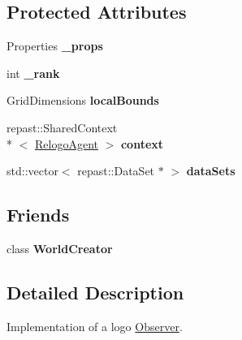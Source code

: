 \subsection*{Protected Attributes}
\begin{DoxyCompactItemize}
\item 
\hypertarget{classrepast_1_1relogo_1_1_observer_a77aae0a56dedd99a7ae481c74407e8d2}{Properties {\bfseries \-\_\-props}}\label{classrepast_1_1relogo_1_1_observer_a77aae0a56dedd99a7ae481c74407e8d2}

\item 
\hypertarget{classrepast_1_1relogo_1_1_observer_a886b32011faa0ed43e084908d80d995b}{int {\bfseries \-\_\-rank}}\label{classrepast_1_1relogo_1_1_observer_a886b32011faa0ed43e084908d80d995b}

\item 
\hypertarget{classrepast_1_1relogo_1_1_observer_a242cab3ecef167edeed2f8598fd7220d}{Grid\-Dimensions {\bfseries local\-Bounds}}\label{classrepast_1_1relogo_1_1_observer_a242cab3ecef167edeed2f8598fd7220d}

\item 
\hypertarget{classrepast_1_1relogo_1_1_observer_a69c5a7ee964212debd1b2a60f75ba847}{repast\-::\-Shared\-Context\\*
$<$ \hyperlink{classrepast_1_1relogo_1_1_relogo_agent}{Relogo\-Agent} $>$ {\bfseries context}}\label{classrepast_1_1relogo_1_1_observer_a69c5a7ee964212debd1b2a60f75ba847}

\item 
\hypertarget{classrepast_1_1relogo_1_1_observer_aaf7ab7bd044b24b5903e8c8fd65feefc}{std\-::vector$<$ repast\-::\-Data\-Set $\ast$ $>$ {\bfseries data\-Sets}}\label{classrepast_1_1relogo_1_1_observer_aaf7ab7bd044b24b5903e8c8fd65feefc}

\end{DoxyCompactItemize}
\subsection*{Friends}
\begin{DoxyCompactItemize}
\item 
\hypertarget{classrepast_1_1relogo_1_1_observer_a8d256944f28ec0cd654da58d4dcff11c}{class {\bfseries World\-Creator}}\label{classrepast_1_1relogo_1_1_observer_a8d256944f28ec0cd654da58d4dcff11c}

\end{DoxyCompactItemize}


\subsection{Detailed Description}
Implementation of a logo \hyperlink{classrepast_1_1relogo_1_1_observer}{Observer}. 

